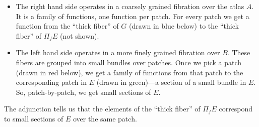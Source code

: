 \documentclass[DaoFP]{subfiles}
\begin{document}
\begin{itemize}
\item The right hand side operates in a coarsely grained fibration over the atlas $A$. It is a family of functions, one function per patch. For every patch we get a function from the ``thick fiber'' of $G$ (drawn in blue below) to the ``thick fiber'' of $\Pi_f E$ (not shown).

\item The left hand side operates in a more finely grained fibration over $B$. These fibers are grouped into small bundles over patches. Once we pick a patch (drawn in red below), we get a family of functions from that patch to the corresponding patch in $E$ (drawn in green)---a section of a small bundle in $E$. So, patch-by-patch, we get small sections of $E$. 
\end{itemize}
The adjunction tells us that the elements of the ``thick fiber'' of $\Pi_f E$ correspond to small sections of $E$ over the same patch.
\end{document}
